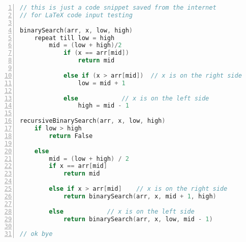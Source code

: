 \documentclass[]{article}
\begin{document}
\begin{lstlisting}[float=hb!,caption={C nyelv},language=c,tabsize=2,showspaces=false,showtabs=false,numbers=left,stepnumber=4,frame=single,framexleftmargin=20pt]
// this is just a code snippet saved from the internet
// for LaTeX code input testing

binarySearch(arr, x, low, high)
	repeat till low = high
		mid = (low + high)/2
			if (x == arr[mid])
				return mid

			else if (x > arr[mid])	// x is on the right side
				low = mid + 1

			else			// x is on the left side
				high = mid - 1

recursiveBinarySearch(arr, x, low, high)
	if low > high
		return False

	else
		mid = (low + high) / 2
		if x == arr[mid]
			return mid

		else if x > arr[mid]	// x is on the right side
			return binarySearch(arr, x, mid + 1, high)

		else			// x is on the left side
			return binarySearch(arr, x, low, mid - 1)

// ok bye
\end{lstlisting}
\end{document}

